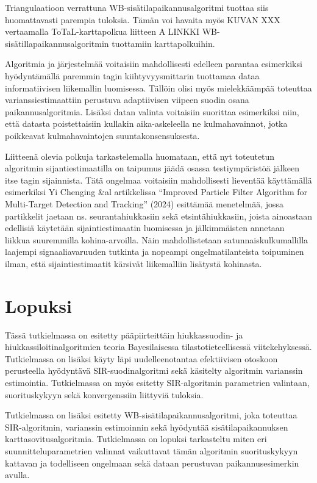 \documentclass[
  12pt,
  a4paper, twoside]{book}
\begin{document}
Triangulaatioon verrattuna WB-sisätilapaikannusalgoritmi tuottaa siis huomattavasti parempia tuloksia. Tämän voi havaita myös KUVAN XXX vertaamalla ToTaL-karttapolkua liitteen A LINKKI WB-sisätillapaikannusalgoritmin tuottamiin karttapolkuihin.

Algoritmia ja järjestelmää voitaisiin mahdollisesti edelleen parantaa esimerkiksi hyödyntämällä paremmin tagin kiihtyvyysmittarin tuottamaa dataa informatiivisen liikemallin luomisessa. Tällöin olisi myös mielekkäämpää toteuttaa varianssiestimaattiin perustuva adaptiivisen viipeen suodin osana paikannusalgoritmia. Lisäksi datan valinta voitaisiin suorittaa esimerkiksi niin, että datasta poistettaisiin kullakin aika-askeleella ne kulmahavainnot, jotka poikkeavat kulmahavaintojen suuntakonsensuksesta.

Liitteenä olevia polkuja tarkastelemalla huomataan, että nyt toteutetun algoritmin sijantiestimaatilla on taipumus jäädä osassa testiympäristöä jälkeen itse tagin sijainnista. Tätä ongelmaa voitaisiin mahdollisesti lieventää käyttämällä esimerkiksi Yi Chenging \&al artikkelissa ``Improved Particle Filter Algorithm for Multi-Target Detection and Tracking'' (2024) \citep{Cheng-2024} esittämää menetelmää, jossa partikkelit jaetaan ns. seurantahiukkasiin sekä etsintähiukkasiin, joista ainoastaan edellisiä käytetään sijaintiestimaatin luomisessa ja jälkimmäisten annetaan liikkua suuremmilla kohina-arvoilla. Näin mahdollistetaan satunnaiskulkumallilla laajempi signaaliavaruuden tutkinta ja nopeampi ongelmatilanteista toipuminen ilman, että sijaintiestimaatit kärsivät liikemalliin lisätystä kohinasta.

\hypertarget{lopuksi}{%
\chapter{Lopuksi}\label{lopuksi}}

Tässä tutkielmassa on esitetty pääpiirteittäin hiukkassuodin- ja hiukkassiloitinalgoritmien teoria Bayesilaisessa tilastotieteellisessä viitekehyksessä. Tutkielmassa on lisäksi käyty läpi uudelleenotantaa efektiivisen otoskoon perusteella hyödyntävä SIR-suodinalgoritmi sekä käsitelty algoritmin varianssin estimointia. Tutkielmassa on myös esitetty SIR-algoritmin parametrien valintaan, suorituskykyyn sekä konvergenssiin liittyviä tuloksia.

Tutkielmassa on lisäksi esitetty WB-sisätilapaikannusalgoritmi, joka toteuttaa SIR-algoritmin, varianssin estimoinnin sekä hyödyntää sisätilapaikannuksen karttasovitusalgoritmia. Tutkielmassa on lopuksi tarkasteltu miten eri suunnitteluparametrien valinnat vaikuttavat tämän algoritmin suorituskykyyn kattavan ja todelliseen ongelmaan sekä dataan perustuvan paikannusesimerkin avulla.
\end{document}
